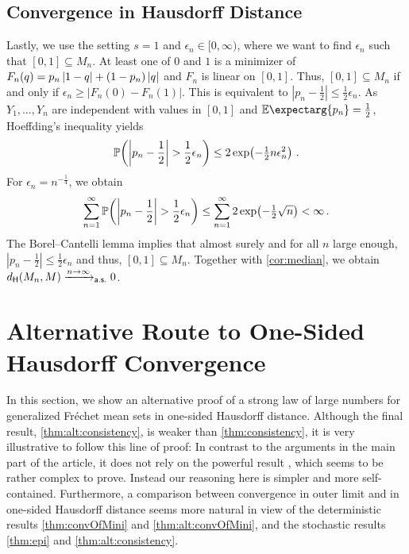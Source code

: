 \documentclass{scrartcl}
\renewcommand{\subset}{\subseteq}
\newcommand{\PrOf}[1]{\Pr\mathopen{}\lb #1 \rb\mathclose{}}
\newcommand{\Ex}{\E\expectarg}
\newcommand*{\ms}[1]{\mathsf{#1}}
\newcommand{\equationFullstop}{\, .}
\newcommand{\eqfs}{\equationFullstop}
\theoremstyle{plain}\newtheorem{theorem}{Theorem}[section]
\theoremstyle{definition}
\theoremstyle{remark}
\begin{document}
\begin{appendix}
\subsection{Convergence in Hausdorff Distance}
Lastly, we use the setting $s=1$ and $\epsilon_n\in[0,\infty)$, where we want to find $\epsilon_n$ such that $[0,1] \subset M_n$.
At least one of $0$ and $1$ is a minimizer of $F_n(q)=p_n\left| 1-q \right|+(1-p_n)\left| q \right|$ and $F_n$ is linear on $[0,1]$. Thus, $[0,1] \subset M_n$ if and only if  $\epsilon_n \geq |F_n(0)-F_n(1)|$. This is equivalent to
 $|p_n-\frac12| \leq \frac12\epsilon_n$.
As $Y_1,\dots, Y_n$ are independent with values in $[0,1]$ and $\Ex{p_n} = \frac12$, Hoeffding's inequality \cite[Theorem 2]{hoeffding63} yields
\begin{equation*}
	\PrOf{\abs{p_n-\frac12} > \frac12\epsilon_n} \leq 2 \exp\brOf{-\tfrac12 n \epsilon_n^2}
	\eqfs
\end{equation*}
For $\epsilon_n = n^{-\frac14}$, we obtain
\begin{equation*}
	\sum_{n=1}^\infty \PrOf{\abs{p_n-\frac12} > \frac12\epsilon_n}  \leq \sum_{n=1}^\infty 2\exp\brOf{-\tfrac12 \sqrt n} < \infty
	\eqfs
\end{equation*}
The Borel--Cantelli lemma implies that almost surely and for all $n$ large enough,  $|p_n-\frac12| \leq \frac12\epsilon_n$ and thus, $[0,1] \subset M_n$.
Together with \autoref{cor:median}, we obtain $d_{\Hausdorff}(M_n, M) \xrightarrow{n\to\infty}_{\ms{a.s.}} 0$.
 \section{Alternative Route to One-Sided Hausdorff Convergence}\label{sec:alt}
In this section, we show an alternative proof of a strong law of large numbers for generalized Fréchet mean sets in one-sided Hausdorff distance. Although the final result, \autoref{thm:alt:consistency}, is weaker than \autoref{thm:consistency}, it is very illustrative to follow this line of proof:
In contrast to the arguments in the main part of the article, it does not rely on the powerful result \cite[Theorem 8.2]{korf01}, which seems to be rather complex to prove. Instead our reasoning here is simpler and more self-contained.
Furthermore, a comparison between convergence in outer limit and in one-sided Hausdorff distance seems more natural in view of the deterministic results \autoref{thm:convOfMini} and \autoref{thm:alt:convOfMini}, and the stochastic results \autoref{thm:epi} and \autoref{thm:alt:consistency}.

\end{appendix}
\end{document}
